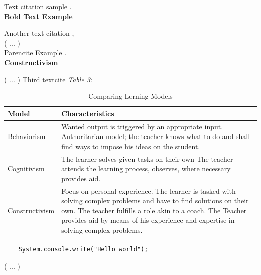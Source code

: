 Text citation sample
\textcite{Vigna}. \\


\textbf{Bold Text Example}

Another text citation \textcite{OWASP},  \\

( ...  ) \\

Parencite Example \parencite{embroker}. \\

\textbf{Constructivism}

( ...  ) Third textcite \textcite{DeciRyan} \emph{Table 3}:

\begin{table} [H]
	\begin{tabular}{ |p{4cm}| p{9.0cm}| }
		\hline
		\textbf{Model}& \textbf{Characteristics}\\
		\hline
		Behaviorism & Wanted output is triggered by an appropriate input. Authoritarian model; the teacher knows what to do and shall find ways to impose his ideas on the student. \\
		Cognitivism & The learner solves given tasks on their own The teacher attends the learning process, observes, where necessary provides aid. \\
		Constructivism & Focus on personal experience. The learner is tasked with solving complex problems and have to find solutions on their own. The teacher fulfills a 	role akin to a coach. The Teacher provides aid by means of his experience and expertise in solving complex problems. \\
		\hline
	\end{tabular}
	\caption{\label{tab:learningModelComparison} Comparing Lerning Models}
\end{table}

\begin{lstlisting}
	System.console.write("Hello world");
\end{lstlisting}

( ... )




